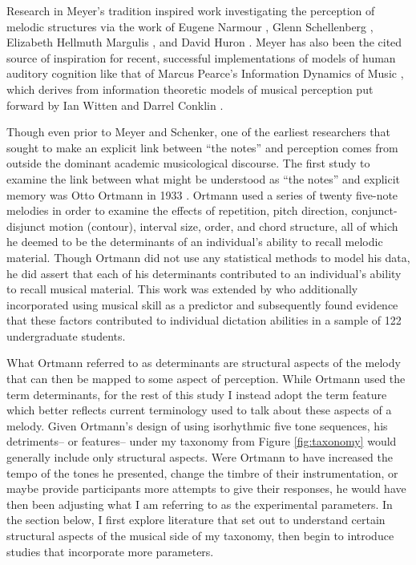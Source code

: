 \documentclass[12pt,]{book}
\begin{document}
Research in Meyer's tradition inspired work investigating the perception of melodic structures via the work of Eugene Narmour \citep{narmourAnalysisCognitionBasic1990, narmourAnalysisCognitionMelodic1992}, Glenn Schellenberg \citep{schellenbergSimplifyingImplicationRealizationModel1997}, Elizabeth Hellmuth Margulis \citep{margulisModelMelodicExpectation2005}, and David Huron \citep{huronSweetAnticipation2006}.
Meyer has also been the cited source of inspiration for recent, successful implementations of models of human auditory cognition like that of Marcus Pearce's Information Dynamics of Music \citep{pearceConstructionEvaluationStatistical2005, pearceStatisticalLearningProbabilistic2018a}, which derives from information theoretic models of musical perception put forward by Ian Witten and Darrel Conklin \citep{conklinMultipleViewpointSystems1995}.

Though even prior to Meyer and Schenker, one of the earliest researchers that sought to make an explicit link between ``the notes'' and perception comes from outside the dominant academic musicological discourse.
The first study to examine the link between what might be understood as ``the notes'' and explicit memory was Otto Ortmann in 1933 \citep{ortmannTonalDeterminantsMelodic1933}.
Ortmann used a series of twenty five-note melodies in order to examine the effects of repetition, pitch direction, conjunct-disjunct motion (contour), interval size, order, and chord structure, all of which he deemed to be the determinants of an individual's ability to recall melodic material.
Though Ortmann did not use any statistical methods to model his data, he did assert that each of his determinants contributed to an individual's ability to recall musical material.
This work was extended by \citet{taylorStrategiesMemoryShort1983} who additionally incorporated using musical skill as a predictor and subsequently found evidence that these factors contributed to individual dictation abilities in a sample of 122 undergraduate students.

What Ortmann referred to as determinants are structural aspects of the melody that can then be mapped to some aspect of perception.
While Ortmann used the term determinants, for the rest of this study I instead adopt the term feature which better reflects current terminology used to talk about these aspects of a melody.
Given Ortmann's design of using isorhythmic five tone sequences, his detriments-- or features-- under my taxonomy from Figure \ref{fig:taxonomy} would generally include only structural aspects.
Were Ortmann to have increased the tempo of the tones he presented, change the timbre of their instrumentation, or maybe provide participants more attempts to give their responses, he would have then been adjusting what I am referring to as the experimental parameters.
In the section below, I first explore literature that set out to understand certain structural aspects of the musical side of my taxonomy, then begin to introduce studies that incorporate more parameters.
\end{document}
